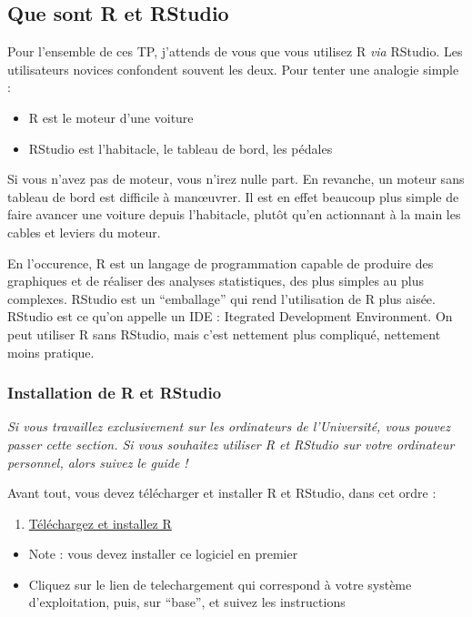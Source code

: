 \documentclass[a4paperpaper,]{article}
\providecommand{\tightlist}{%
  \setlength{\itemsep}{0pt}\setlength{\parskip}{0pt}}
\theoremstyle{definition}
\theoremstyle{definition}
\theoremstyle{definition}
\theoremstyle{remark}
\begin{document}
\subsection{Que sont R et RStudio}\label{que-sont-r-et-rstudio}

Pour l'ensemble de ces TP, j'attends de vous que vous utilisez R
\emph{via} RStudio. Les utilisateurs novices confondent souvent les
deux. Pour tenter une analogie simple :

\begin{itemize}
\tightlist
\item
  R est le moteur d'une voiture
\item
  RStudio est l'habitacle, le tableau de bord, les pédales
\end{itemize}

Si vous n'avez pas de moteur, vous n'irez nulle part. En revanche, un
moteur sans tableau de bord est difficile à manœuvrer. Il est en effet
beaucoup plus simple de faire avancer une voiture depuis l'habitacle,
plutôt qu'en actionnant à la main les cables et leviers du moteur.

En l'occurence, R est un langage de programmation capable de produire
des graphiques et de réaliser des analyses statistiques, des plus
simples au plus complexes. RStudio est un ``emballage'' qui rend
l'utilisation de R plus aisée. RStudio est ce qu'on appelle un IDE :
Itegrated Development Environment. On peut utiliser R sans RStudio, mais
c'est nettement plus compliqué, nettement moins pratique.

\subsubsection{Installation de R et
RStudio}\label{installation-de-r-et-rstudio}

\emph{Si vous travaillez exclusivement sur les ordinateurs de
l'Université, vous pouvez passer cette section. Si vous souhaitez
utiliser R et RStudio sur votre ordinateur personnel, alors suivez le
guide !}

Avant tout, vous devez télécharger et installer R et RStudio, dans cet
ordre :

\begin{enumerate}
\def\labelenumi{\arabic{enumi}.}
\tightlist
\item
  \href{https://cran.r-project.org}{Téléchargez et installez R}
\end{enumerate}

\begin{itemize}
\tightlist
\item
  Note : vous devez installer ce logiciel en premier
\item
  Cliquez sur le lien de telechargement qui correspond à votre système
  d'exploitation, puis, sur ``base'', et suivez les instructions
\end{itemize}
\end{document}
